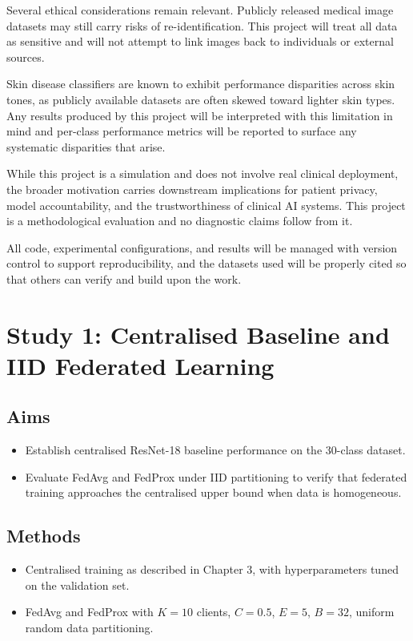 \documentclass[12pt,openany,a4paper]{book}
\begin{document}
Several ethical considerations remain relevant. Publicly released medical image datasets may still carry risks of re-identification. This project will treat all data as sensitive and will not attempt to link images back to individuals or external sources.

Skin disease classifiers are known to exhibit performance disparities across skin tones, as publicly available datasets are often skewed toward lighter skin types. Any results produced by this project will be interpreted with this limitation in mind and per-class performance metrics will be reported to surface any systematic disparities that arise.

While this project is a simulation and does not involve real clinical deployment, the broader motivation carries downstream implications for patient privacy, model accountability, and the trustworthiness of clinical AI systems. This project is a methodological evaluation and no diagnostic claims follow from it.

All code, experimental configurations, and results will be managed with version control to support reproducibility, and the datasets used will be properly cited so that others can verify and build upon the work.



\chapter{Study 1: Centralised Baseline and IID Federated Learning}

\section{Aims}
\begin{itemize}
  \item Establish centralised ResNet-18 baseline performance on the 30-class dataset.
  \item Evaluate FedAvg and FedProx under IID partitioning to verify that federated training approaches the centralised upper bound when data is homogeneous.
\end{itemize}

\section{Methods}
\begin{itemize}
  \item Centralised training as described in Chapter 3, with hyperparameters tuned on the validation set.
  \item FedAvg and FedProx with $K = 10$ clients, $C = 0.5$, $E = 5$, $B = 32$, uniform random data partitioning.
\end{itemize}
\end{document}
